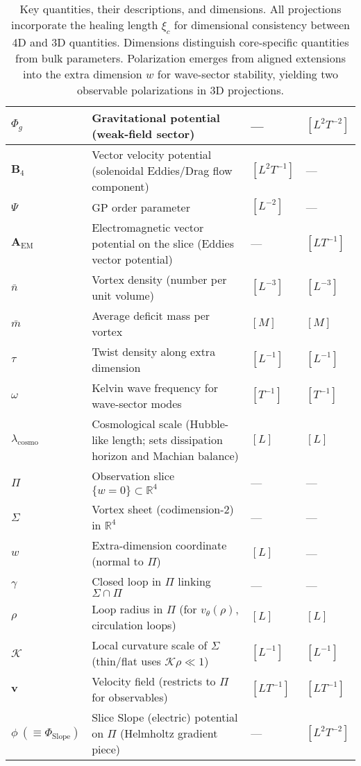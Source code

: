 \begin{table}[H]
\begin{tabularx}{\textwidth}{|l|Y|l|l|}
\hline
$\Phi_g$ & Gravitational potential (weak-field sector) & --- & $[L^2 T^{-2}]$ \\
\hline
$\mathbf{B}_4$ & Vector velocity potential (solenoidal Eddies/Drag flow component) & $[L^2 T^{-1}]$ & --- \\
\hline
$\Psi$ & GP order parameter & $[L^{-2}]$ & --- \\
\hline
$\mathbf{A}_{\text{EM}}$ & Electromagnetic vector potential on the slice (Eddies vector potential) & --- & $[L T^{-1}]$ \\
\hline
$\bar{n}$ & Vortex density (number per unit volume) & $[L^{-3}]$ & $[L^{-3}]$ \\
\hline
$\bar{m}$ & Average deficit mass per vortex & $[M]$ & $[M]$ \\
\hline
$\tau$ & Twist density along extra dimension & $[L^{-1}]$ & $[L^{-1}]$ \\
\hline
$\omega$ & Kelvin wave frequency for wave-sector modes & $[T^{-1}]$ & $[T^{-1}]$ \\
\hline
$\lambda_{\text{cosmo}}$ & Cosmological scale (Hubble-like length; sets dissipation horizon and Machian balance) & $[L]$ & $[L]$ \\
\hline
$\Pi$ & Observation slice $\{w=0\}\subset\mathbb{R}^4$ & --- & --- \\
\hline
$\Sigma$ & Vortex sheet (codimension-2) in $\mathbb{R}^4$ & --- & --- \\
\hline
$w$ & Extra-dimension coordinate (normal to $\Pi$) & $[L]$ & --- \\
\hline
$\gamma$ & Closed loop in $\Pi$ linking $\Sigma\cap\Pi$ & --- & --- \\
\hline
$\rho$ & Loop radius in $\Pi$ (for $v_\theta(\rho)$, circulation loops) & $[L]$ & $[L]$ \\
\hline
$\mathcal{K}$ & Local curvature scale of $\Sigma$ (thin/flat uses $\mathcal{K}\rho\ll1$) & $[L^{-1}]$ & $[L^{-1}]$ \\
\hline
$\mathbf{v}$ & Velocity field (restricts to $\Pi$ for observables) & $[L T^{-1}]$ & $[L T^{-1}]$ \\
\hline
$\phi\ (\equiv \Phi_{\text{Slope}})$ & Slice Slope (electric) potential on $\Pi$ (Helmholtz gradient piece) & --- & $[L^2 T^{-2}]$ \\
\hline
\end{tabularx}
\endgroup
\caption{Key quantities, their descriptions, and dimensions. All projections incorporate the healing length $\xi_c$ for dimensional consistency between 4D and 3D quantities. Dimensions distinguish core-specific quantities from bulk parameters. Polarization emerges from aligned extensions into the extra dimension $w$ for wave-sector stability, yielding two observable polarizations in 3D projections.}
\label{tab:notation}
\end{table}

